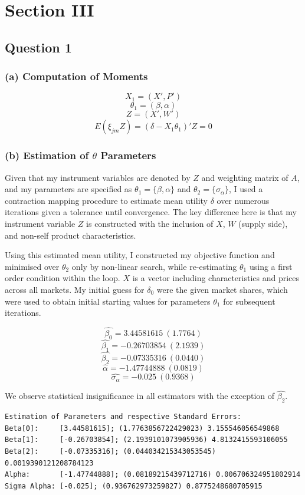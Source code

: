 \documentclass{article}
\begin{document}
\newpage
\newpage
\section{Section III}
\subsection{Question 1}

\subsubsection{(a) Computation of Moments}
$$X_1=(X', P')$$
$$\theta_1=(\beta, \alpha)$$
$$Z=(X', W')$$
$$E(\xi_{jm} Z)=( \delta - X_1 \theta_1 )'Z=0$$

\subsubsection{(b) Estimation of $\theta$ Parameters}
Given that my instrument variables are denoted by $Z$ and weighting matrix of $A$, and my parameters are specified as $\theta_1=\{ \beta, \alpha \}$ and $\theta_2=\{ \sigma_\alpha \}$, I used a contraction mapping procedure to estimate mean utility $\delta$ over numerous iterations given a tolerance until convergence. The key difference here is that my instrument variable $Z$ is constructed with the inclusion of $X$, $W$ (supply side), and non-self product characteristics.

\par Using this estimated mean utility, I constructed my objective function and minimised over $\theta_2$ only by non-linear search, while re-estimating $\theta_1$ using a first order condition within the loop. $X$ is a vector including characteristics and prices across all markets. My initial guess for $\delta_0$ were the given market shares, which were used to obtain initial starting values for parameters $\theta_1$ for subsequent iterations.

$$\hat{\beta_0}=3.44581615\:(1.7764)$$
$$\hat{\beta_1}=-0.26703854\:(2.1939)$$
$$\hat{\beta_2}=-0.07335316\:(0.0440)$$
$$\hat{\alpha}=-1.47744888\:(0.0819)$$
$$\hat{\sigma_{\alpha}}=-0.025\:(0.9368)$$

We observe statistical insignificance in all estimators with the exception of $\hat{\beta_2}$.

\begin{lstlisting}
Estimation of Parameters and respective Standard Errors:
Beta[0]:     [3.44581615]; (1.7763856722429023) 3.155546056549868
Beta[1]:     [-0.26703854]; (2.1939101073905936) 4.8132415593106055
Beta[2]:     [-0.07335316]; (0.044034215343053545) 0.0019390121208784123
Alpha:       [-1.47744888]; (0.08189215439712716) 0.006706324951802914
Sigma Alpha: [-0.025]; (0.936762973259827) 0.8775248680705915
\end{lstlisting}
\end{document}
